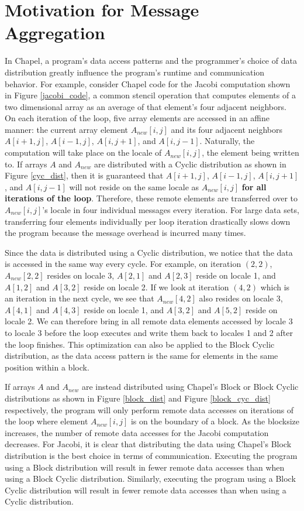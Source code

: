 \section{Motivation for Message Aggregation}\label{sec:motivation_for_aggregation} 

In Chapel, a program's data access patterns and the programmer's choice of data distribution greatly influence the program's runtime and communication behavior. For example, consider Chapel code for the Jacobi computation shown in Figure \ref{jacobi_code}, a common stencil operation that computes elements of a two dimensional array as an average of that element's four adjacent neighbors. On each iteration of the loop, five array elements are accessed in an affine manner: the current array element $A_{new}[i, j]$ and its four adjacent neighbors $A[i+1, j]$, $A[i-1, j]$, $A[i, j+1]$, and $A[i, j-1]$. Naturally, the computation will take place on the locale of $A_{new}[i, j]$, the element being written to. If arrays $A$ and $A_{new}$ are distributed with a Cyclic distribution as shown in Figure \ref{cyc_dist}, then it is guaranteed that $A[i+1, j]$, $A[i-1, j]$, $A[i, j+1]$, and $A[i, j-1]$ will not reside on the same locale as $A_{new}[i, j]$ \textbf{for all iterations of the loop}. Therefore, these remote elements are transferred over to $A_{new}[i, j]$'s locale in four individual messages every iteration. For large data sets, transferring four elements individually per loop iteration drastically slows down the program because the message overhead is incurred many times. 

Since the data is distributed using a Cyclic distribution, we notice that the data is accessed in the same way every cycle. For example, on iteration $(2, 2)$, $A_{new}[2, 2]$ resides on locale 3, $A[2, 1]$ and $A[2, 3]$ reside on locale 1, and $A[1, 2]$ and $A[3, 2]$ reside on locale 2. If we look at iteration $(4, 2)$ which is an iteration in the next cycle, we see that $A_{new}[4, 2]$ also resides on locale 3, $A[4, 1]$ and $A[4, 3]$ reside on locale 1, and $A[3, 2]$ and $A[5, 2]$ reside on locale 2. We can therefore bring in all remote data elements accessed by locale 3 to locale 3 before the loop executes and write them back to locales 1 and 2 after the loop finishes. This optimization can also be applied to the Block Cyclic distribution, as the data access pattern is the same for elements in the same position within a block. 

If arrays $A$ and $A_{new}$ are instead distributed using Chapel's Block or Block Cyclic distributions as shown in Figure \ref{block_dist} and Figure \ref{block_cyc_dist} respectively, the program will only perform remote data accesses on iterations of the loop where element $A_{new}[i, j]$ is on the boundary of a block. As the blocksize increases, the number of remote data accesses for the Jacobi computation decreases. For Jacobi, it is clear that distributing the data using Chapel's Block distribution is the best choice in terms of communication. Executing the program using a Block distribution will result in fewer remote data accesses than when using a Block Cyclic distribution. Similarly, executing the program using a Block Cyclic distribution will result in fewer remote data accesses than when using a Cyclic distribution. 

